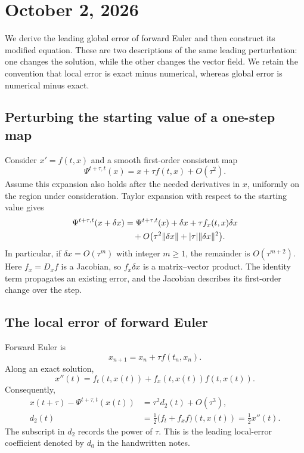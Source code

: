 \section{October 2, 2026}

We derive the leading global error of forward Euler and then construct
its modified equation. These are two descriptions of the same leading
perturbation: one changes the solution, while the other changes the
vector field. We retain the convention that local error is exact
minus numerical, whereas global error is numerical minus exact.

\subsection{Perturbing the starting value of a one-step map}

Consider \(x'=f(t,x)\) and a smooth first-order consistent map
\[
 \Psi^{t+\tau,t}(x)=x+\tau f(t,x)+O(\tau^2).
\]
Assume this expansion also holds after the needed derivatives in
\(x\), uniformly on the region under consideration. Taylor expansion
with respect to the starting value gives
\begin{align}
 \Psi^{t+\tau,t}(x+\delta x)
  &=\Psi^{t+\tau,t}(x)+\delta x
       +\tau f_x(t,x)\delta x\notag\\
  &\quad+O\bigl(\tau^2\|\delta x\|
                      +|\tau|\|\delta x\|^2\bigr).
       \label{eq:step-perturbation-oct-02}
\end{align}
In particular, if \(\delta x=O(\tau^m)\) with integer \(m\geq1\),
the remainder is \(O(\tau^{m+2})\). Here \(f_x=D_xf\) is a
Jacobian, so \(f_x\delta x\) is a matrix--vector product.
The identity term propagates an existing error, and the Jacobian
describes its first-order change over the step.

\subsection{The local error of forward Euler}

Forward Euler is
\begin{equation}\label{eq:euler-oct-02}
 x_{n+1}=x_n+\tau f(t_n,x_n).
\end{equation}
Along an exact solution,
\[
 x''(t)=f_t(t,x(t))+f_x(t,x(t))f(t,x(t)).
\]
Consequently,
\begin{align}
 x(t+\tau)-\Psi^{t+\tau,t}(x(t))
    &=\tau^2 d_2(t)+O(\tau^3),
       \label{eq:euler-defect-oct-02}\\
 d_2(t)&=\frac12
   \bigl(f_t+f_xf\bigr)(t,x(t))=\frac12x''(t).
       \label{eq:euler-d2-oct-02}
\end{align}
The subscript in \(d_2\) records the power of \(\tau\). This is
the leading local-error coefficient denoted by \(d_0\) in the
handwritten notes.

